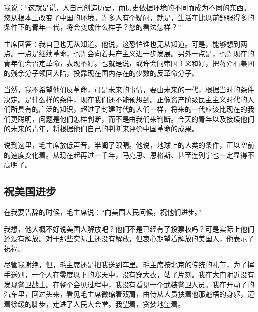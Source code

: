 我说：“这就是说，人自己创造历史，而历史依据环境的不同而成为不同的东西。您从根本上改变了中国的环境。许多人有个疑问，就是，生活在比以前舒服得多的条件下的青年一代，将会变成什么样子？您的看法怎样？”

主席回答：我自己也无从知道。他说，这恐怕谁也无从知道。可是，能够想到两点。一点是继续革命，也许会向着共产主义进一步发展。另外一点是，也许现在的青年们会否定革命，表现不好。也就是说，或许会同帝国主义和好，把蒋介石集团的残余分子领回大陆，投靠现在国内存在的少数的反革命分子。

当然，我不希望他们反革命，可是未来的事情，要由未来的一代，根据当时的条件决定。是什么样的条件，现在我们还不能预想到。正像资产阶级民主主义时代的人们所具有的广泛的知识，超过了封建时代的人们一样，将来的一代应该比现在的我们更聪明，问题是他们怎样判断，而不是由我们来判断。今天的青年以及接续他们的未来的青年，将根据他们自己的判断来评价中国革命的成果。

说到这里，毛主席放低声音，半阖了跟睛。他说，地球上的人类的条件，正以空前的速度变化着。从现在起再过一千年，马克思、恩格斯、甚至连列宁也一定显得不高明了。

\subsection{祝美国进步}

在我要告辞的时候，毛主席说：“向美国人民问候，祝他们进步。”

我想，他大概不好说美国人解放吧？他们不是已经有了投票权吗？可是实际上他们还没有解放。对于那些实际上还没有解放，但衷心期望着解放的美国人，他表示了祝福。

尽管我谢绝，但，毛主席还是把我送到车里。毛主席按北京的传统的礼节，为了挥手送别，一个人在零度以下的寒天中，没有穿大衣，站了片刻。我在大门附近没有发现警卫战士。在整个会见过程中，我没有看见一个武装警卫人员。我在开动了的汽车里，回过头来，看见毛主席微缩着双肩，由侍从人员扶着他那魁梧的身躯，迈着徐缓的脚步，走进了人民大会堂。我望着，贪婪地望着。


